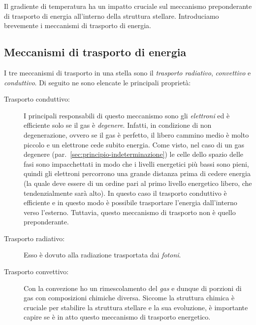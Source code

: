 Il gradiente di temperatura ha un impatto cruciale sul meccanismo preponderante di trasporto di energia all'interno della struttura stellare. Introduciamo brevemente i meccanismi di trasporto di energia.

\subsection{Meccanismi di trasporto di energia}
I tre meccanismi di trasporto in una stella sono il \emph{trasporto radiativo}, \emph{convettivo} e \emph{conduttivo}. Di seguito ne sono elencate le principali proprietà:
\begin{description}
    \item[Trasporto conduttivo:] I principali responsabili di questo meccanismo sono gli \emph{elettroni} ed è efficiente solo se il gas è \emph{degenere}. Infatti, in condizione di non degenerazione, ovvero se il gas è perfetto, il libero cammino medio è molto piccolo e un elettrone cede subito energia. Come visto, nel caso di un gas degenere (par.~\ref{sec:principio-indeterminazione}) le celle dello spazio delle fasi sono impacchettati in modo che i livelli energetici più bassi sono pieni, quindi gli elettroni percorrono una grande distanza prima di cedere energia (la quale deve essere di un ordine pari al primo livello energetico libero, che tendenzialmente sarà alto). In questo caso il trasporto conduttivo è efficiente e in questo modo è possibile trasportare l'energia dall'interno verso l'esterno. Tuttavia, questo meccanismo di trasporto non è quello preponderante.
    \item[Trasporto radiativo:] Esso è dovuto alla radiazione trasportata dai \emph{fotoni}.
    \item[Trasporto convettivo:] Con la convezione ho un rimescolamento del \emph{gas} e dunque di porzioni di gas con composizioni chimiche diversa. Siccome la struttura chimica è cruciale per stabilire la struttura stellare e la sua evoluzione, è importante capire se è in atto questo meccanismo di trasporto energetico.
\end{description}

